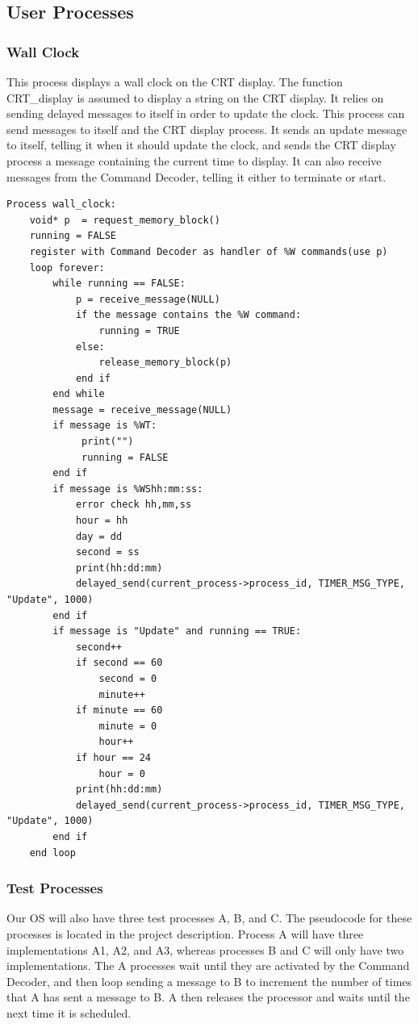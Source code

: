 \documentclass[titlepage]{article}
\begin{document}
\subsection{User Processes}
\subsubsection{Wall Clock}
This process displays a wall clock on the CRT display.  The function
CRT\_display is assumed to display a string on the CRT display.  It relies on
sending delayed messages to itself in order to update the clock.  This process
can send messages to itself and the CRT display process.  It sends an update
message to itself, telling it when it should update the clock, and sends the CRT
display process a message containing the current time to display.  It can also
receive messages from the Command Decoder, telling it either to terminate or
start.
\begin{verbatim}
Process wall_clock:
    void* p  = request_memory_block()
    running = FALSE
    register with Command Decoder as handler of %W commands(use p)
    loop forever:
        while running == FALSE:
            p = receive_message(NULL)
            if the message contains the %W command:
                running = TRUE
            else:
                release_memory_block(p)
            end if
        end while
        message = receive_message(NULL)
        if message is %WT:
             print("")
             running = FALSE
        end if
        if message is %WShh:mm:ss:
            error check hh,mm,ss
            hour = hh
            day = dd
            second = ss
            print(hh:dd:mm)
            delayed_send(current_process->process_id, TIMER_MSG_TYPE, "Update", 1000)
        end if
        if message is "Update" and running == TRUE:
            second++
            if second == 60
                second = 0
                minute++
            if minute == 60
                minute = 0
                hour++
            if hour == 24
                hour = 0
            print(hh:dd:mm)
            delayed_send(current_process->process_id, TIMER_MSG_TYPE, "Update", 1000)
        end if
    end loop
\end{verbatim}

\subsubsection{Test Processes}
Our OS will also have three test processes A, B, and C.  The pseudocode for
these processes is located in the project description. Process A will have three
implementations A1, A2, and A3, whereas processes B and C will only have two
implementations.  The A processes wait until they are activated by the Command
Decoder, and then loop sending a message to B to increment the number of times
that A has sent a message to B.  A then releases the processor and waits until
the next time it is scheduled.
\end{document}
